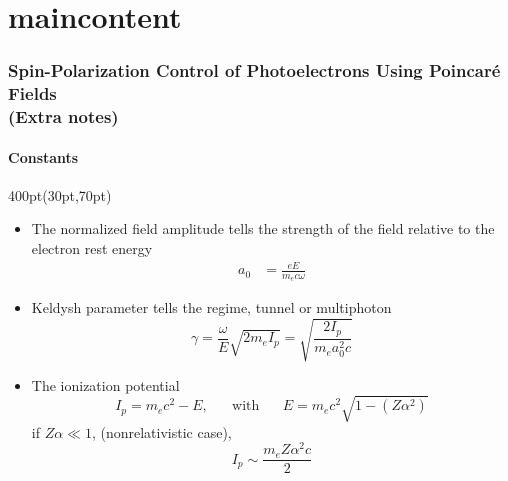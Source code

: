 
\section{maincontent}


\begin{frame}
\frametitle{Spin-Polarization Control of Photoelectrons
Using Poincar\'e Fields \\
\small (Extra notes)}
\framesubtitle{Constants}


\footnotesize
\begin{textblock*}{400pt}(30pt,70pt)
\begin{itemize}
\item The normalized field amplitude tells the strength of the field 
relative to the electron rest energy
\begin{align}
a_0 & = \frac{eE}{m_e c\omega}
\end{align}
\item Keldysh parameter tells the regime, tunnel or multiphoton
\begin{equation}
\gamma = \frac{\omega}{E}\sqrt{2m_eI_p} = \sqrt{\frac{2I_p}{m_ea_0^2 c}}
\end{equation}
\item The ionization potential
\begin{equation}
I_p = m_ec^2 -E, \hspace{20pt} \mbox{with} \hspace{20pt}
E = m_e c^2\sqrt{1-(Z\alpha^2)}
\end{equation}
if $Z\alpha \ll 1$, (nonrelativistic case), 
\begin{equation}
I_p \sim \frac{m_eZ\alpha^2c}{2}
\end{equation}
\end{itemize}
\end{textblock*}
 
\end{frame}

